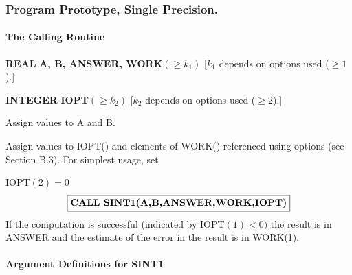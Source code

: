 \documentclass[twoside]{MATH77}
\begin{document}
\subsubsection{Program Prototype, Single Precision.\label{PPSP}}

\paragraph{The Calling Routine\label{Calling}}

{\bf REAL} {\bf A, B, ANSWER, WORK$(\geq k_1)$}
[$k_1$ depends on options used ($\geq 1$).]


{\bf INTEGER} {\bf IOPT$(\geq k_2)$} [$k_2$ depends on options used
($\geq 2$).]


Assign values to A and B.

Assign values to IOPT() and elements of WORK() referenced using options (see
Section B.3). For simplest usage, set

\hspace{.2in}IOPT$(2)=0$%
$$
\fbox{{\bf CALL SINT1(A,B,ANSWER,WORK,IOPT)}}
$$
If the computation is successful (indicated by IOPT$(1)<0)$ the result is in
ANSWER and the estimate of the error in the result is in WORK(1).

\vspace{20pt}
\paragraph{Argument Definitions for SINT1\label{ArgDef}}
\end{document}
